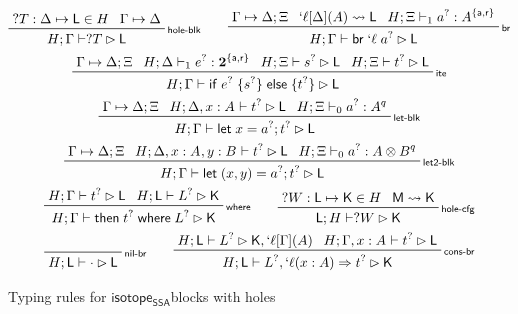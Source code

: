 \documentclass[acmsmall,screen,review]{acmart}
\newcommand{\mb}[1]{\ensuremath{\mathbf{#1}}}
\newcommand{\ms}[1]{\ensuremath{\mathsf{#1}}}
\newcommand{\lbl}[1]{{`#1}}
\newcommand{\lto}{\Rightarrow}
\newcommand{\letstmt}[3]{\ensuremath{\ms{let}\;#1 = #2; #3}}
\newcommand{\brb}[2]{\ms{br}\;#1\;#2}
\newcommand{\lbrb}[2]{\brb{\lbl{#1}}{#2}}
\newcommand{\ite}[3]{\ms{if}\;#1\;\{#2\}\;\ms{else}\;\{#3\}}
\newcommand{\ewhere}[2]{\ms{then}\;#1\;\ms{where}\;#2}
\newcommand{\wbranch}[3]{#1(#2) \lto #3}
\newcommand{\lwbranch}[3]{\wbranch{\lbl{#1}}{#2}{#3}}
\newcommand{\csplits}[3]{#1 \mapsto #2;#3}
\newcommand{\cwk}[2]{#1 \mapsto #2}
\newcommand{\lwk}[2]{#1 \rightsquigarrow #2}
\newcommand{\thyp}[3]{#1: {#2}^{#3}}
\newcommand{\lhyp}[3]{#1[#2](#3)}
\newcommand{\llhyp}[3]{\lhyp{\lbl{#1}}{#2}{#3}}
\newcommand{\rle}[1]{{\scriptsize\textsf{#1}}}
\newcommand{\tint}{{\{\ms{a}, \ms{r}\}}}
\newcommand{\mhole}[1]{{#1}^?}
\newcommand{\lhole}[1]{?#1}
\newcommand{\mhasty}[6]{#1;#2 \vdash_{#3} #4: {#5}^{#6}}
\newcommand{\mhaslb}[4]{#1;#2 \vdash #3 \rhd #4}
\newcommand{\mlhaslb}[4]{#1;#2 \vdash #3 \rhd #4}
\newcommand{\blkhole}[3]{#1: #2 \mapsto #3}
\newcommand{\cfghole}[3]{#1: #2 \mapsto #3}
\newcommand{\isotopessa}{\ms{isotope_{SSA}}}
\begin{document}
\begin{figure}
  \begin{gather*}    
    \prftree[r]{\rle{hole-blk}}
      {\blkhole{\lhole{T}}{\Delta}{\ms{L}} \in H}
      {\cwk{\Gamma}{\Delta}}
      {\mhaslb{H}{\Gamma}{\lhole{T}}{\ms{L}}} 
      \qquad
    \prftree[r]{\rle{br}}
      {\csplits{\Gamma}{\Delta}{\Xi}}
      {\lwk{\llhyp{\ell}{\Delta}{A}}{\ms{L}}}
      {\mhasty{H}{\Xi}{1}{\mhole{a}}{A}{\tint}}
      {\mhaslb{H}{\Gamma}{\lbrb{\ell}{\mhole{a}}}{\ms{L}}} 
      \\
    \prftree[r]{\rle{ite}}
      {\csplits{\Gamma}{\Delta}{\Xi}}
      {\mhasty{H}{\Delta}{1}{\mhole{e}}{\mb{2}}{\tint}}
      {\mhaslb{H}{\Xi}{\mhole{s}}{\ms{L}}}
      {\mhaslb{H}{\Xi}{\mhole{t}}{\ms{L}}}
      {\mhaslb{H}{\Gamma}{\ite{\mhole{e}}{\mhole{s}}{\mhole{t}}}{\ms{L}}} \\
    \prftree[r]{\rle{let-blk}}
      {\csplits{\Gamma}{\Delta}{\Xi}}
      {\mhaslb{H}{\Delta, \thyp{x}{A}{}}{\mhole{t}}{\ms{L}}}
      {\mhasty{H}{\Xi}{0}{\mhole{a}}{A}{q}}
      {\mhaslb{H}{\Gamma}{\letstmt{x}{\mhole{a}}{\mhole{t}}}{\ms{L}}} \\
    \prftree[r]{\rle{let2-blk}}
      {\csplits{\Gamma}{\Delta}{\Xi}}
      {\mhaslb{H}{\Delta, \thyp{x}{A}{}, \thyp{y}{B}{}}{\mhole{t}}{\ms{L}}}
      {\mhasty{H}{\Xi}{0}{\mhole{a}}{A \otimes B}{q}}
      {\mhaslb{H}{\Gamma}{\letstmt{(x, y)}{\mhole{a}}{\mhole{t}}}{\ms{L}}} \\
    \prftree[r]{\rle{where}}
      {\mhaslb{H}{\Gamma}{\mhole{t}}{\ms{L}}}
      {\mlhaslb{H}{\ms{L}}{\mhole{L}}{\ms{K}}}
      {\mhaslb{H}{\Gamma}{\ewhere{\mhole{t}}{\mhole{L}}}{\ms{K}}} 
      \qquad
    \prftree[r]{\rle{hole-cfg}}
      {\cfghole{\lhole{W}}{\ms{L}}{\ms{K}} \in H}
      {\lwk{\ms{M}}{\ms{K}}}
      {\mlhaslb{\ms{L}}{H}{\lhole{W}}{\ms{K}}}
      \\
    \prftree[r]{\rle{nil-br}}
      {\mlhaslb{H}{\ms{L}}{\cdot}{\ms{L}}} \qquad
    \prftree[r]{\rle{cons-br}}
      {\mlhaslb{H}{\ms{L}}{\mhole{L}}{\ms{K}, \llhyp{\ell}{\Gamma}{A}}}
      {\mhaslb{H}{\Gamma, \thyp{x}{A}{}}{\mhole{t}}{\ms{L}}}
      {\mlhaslb{H}{\ms{L}}{\mhole{L}, \lwbranch{\ell}{x: A}{\mhole{t}}}{\ms{K}}}
  \end{gather*}
  \caption{Typing rules for \isotopessa blocks with holes}
  \label{fig:blocks-with-holes-typing}
\end{figure}
\end{document}
